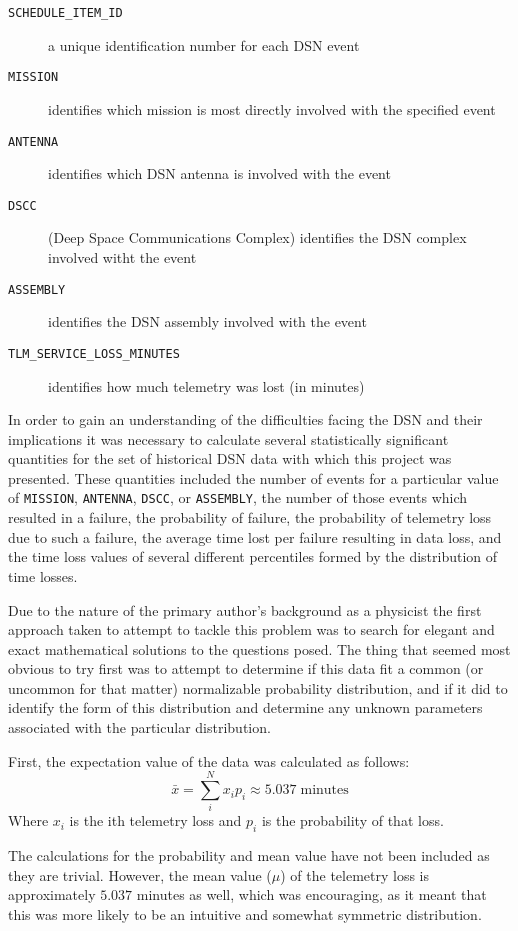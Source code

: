 \documentclass[aps,twocolumn,nobalancelastpage,amsmath,amssymb,
nofootinbib,superscriptaddress, ]{revtex4}
\begin{document}
\begin{description}
  	\item[\texttt{SCHEDULE\_ITEM\_ID}] a unique identification number for each DSN event
  	\item[\texttt{MISSION}] identifies which mission is most directly involved with the specified event
 	\item[\texttt{ANTENNA}] identifies which DSN antenna is involved with the event
 	\item[\texttt{DSCC}] (Deep Space Communications Complex) identifies the DSN complex involved witht the event
	\item[\texttt{ASSEMBLY}] identifies the DSN assembly involved with the event
	\item[\texttt{TLM\_SERVICE\_LOSS\_MINUTES}] identifies how much telemetry was lost (in minutes)
\end{description}

In order to gain an understanding of the difficulties facing the DSN and their implications it was necessary to calculate several statistically significant quantities for the set of historical DSN data with which this project was presented. These quantities included the number of events for a particular value of \texttt{MISSION}, \texttt{ANTENNA}, \texttt{DSCC}, or \texttt{ASSEMBLY}, the number of those events which resulted in a failure, the probability of failure, the probability of telemetry loss due to such a failure, the average time lost per failure resulting in data loss, and the time loss values of several different percentiles formed by the distribution of time losses.

Due to the nature of the primary author's background as a physicist the first approach taken to attempt to tackle this problem was to search for elegant and exact mathematical solutions to the questions posed. The thing that seemed most obvious to try first was to attempt to determine if this data fit a common (or uncommon for that matter) normalizable probability distribution, and if it did to identify the form of this distribution and determine any unknown parameters associated with the particular distribution.

First, the expectation value of the data was calculated as follows:
$$  \bar{x} = \sum_{i}^{N} x_ip_i \approx 5.037 \; \text{minutes}$$
Where $x_i$ is the ith telemetry loss and $p_i$ is the probability of that loss.

The calculations for the probability and mean value have not been included as they are trivial. However, the mean value ($\mu$) of the telemetry loss is approximately $5.037$ minutes as well, which was encouraging, as it meant that this was more likely to be an intuitive and somewhat symmetric distribution.
\end{document}
